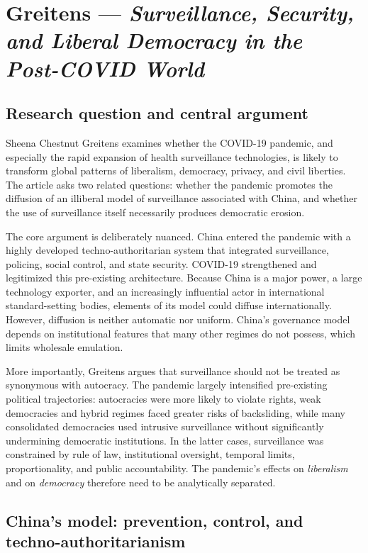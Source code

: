 \clearpage
\section{Greitens --- \textit{Surveillance, Security, and Liberal Democracy in the Post-COVID World}}

\subsection{Research question and central argument}

Sheena Chestnut Greitens examines whether the COVID-19 pandemic, and especially the rapid expansion of health surveillance technologies, is likely to transform global patterns of liberalism, democracy, privacy, and civil liberties. The article asks two related questions: whether the pandemic promotes the diffusion of an illiberal model of surveillance associated with China, and whether the use of surveillance itself necessarily produces democratic erosion.

The core argument is deliberately nuanced. China entered the pandemic with a highly developed techno-authoritarian system that integrated surveillance, policing, social control, and state security. COVID-19 strengthened and legitimized this pre-existing architecture. Because China is a major power, a large technology exporter, and an increasingly influential actor in international standard-setting bodies, elements of its model could diffuse internationally. However, diffusion is neither automatic nor uniform. China's governance model depends on institutional features that many other regimes do not possess, which limits wholesale emulation.

More importantly, Greitens argues that surveillance should not be treated as synonymous with autocracy. The pandemic largely intensified pre-existing political trajectories: autocracies were more likely to violate rights, weak democracies and hybrid regimes faced greater risks of backsliding, while many consolidated democracies used intrusive surveillance without significantly undermining democratic institutions. In the latter cases, surveillance was constrained by rule of law, institutional oversight, temporal limits, proportionality, and public accountability. The pandemic's effects on \textit{liberalism} and on \textit{democracy} therefore need to be analytically separated.

\subsection{China's model: prevention, control, and techno-authoritarianism}

